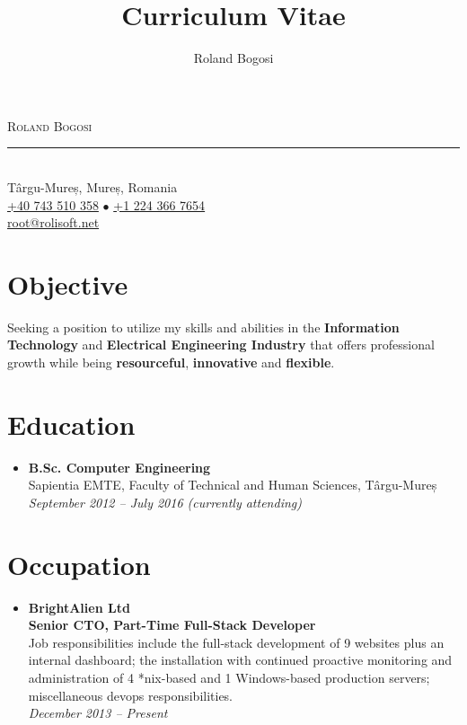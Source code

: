 \documentclass[12pt,a4paper]{article}
\author{Roland Bogosi}
\title{Curriculum Vitae}
\begin{document}
	\begin{center}
	\textsc{\Huge Roland Bogosi}\\
	\vspace{-2mm}
	\rule{300pt\color{LightGray}}{0.5px}\\
	\vspace{0.5mm}
	{\lsstyle\color{DarkGray} Târgu-Mureș, Mureș, Romania\\
	\href{tel:+40743510358}{\color{DarkGray} +40 743 510 358} {\color{LightGray}$\bullet$} \href{tel:+12243667654}{\color{DarkGray} +1 224 366 7654}\\
	\href{mailto:root@rolisoft.net}{\color{DarkGray} root@rolisoft.net}}
	\end{center}

\section*{Objective}
	Seeking a position to utilize my skills and abilities in the \textbf{Information Technology} and \textbf{Electrical Engineering Industry} that offers professional growth while being \textbf{resourceful}, \textbf{innovative} and \textbf{flexible}.

\section*{Education}
	\begin{itemize}
	\item	{\large\textbf{B.Sc. Computer Engineering}}\\
			Sapientia EMTE, Faculty of Technical and Human Sciences, Târgu-Mureș\\
			\textit{September 2012 – July 2016 (currently attending)}
	\end{itemize}

\section*{Occupation}
	\begin{itemize}
	\item	{\large\textbf{BrightAlien Ltd}}\\
			\textbf{Senior CTO, Part-Time Full-Stack Developer}\\
			Job responsibilities include the full-stack development of 9 websites plus an internal dashboard; the installation with continued proactive monitoring and administration of 4 *nix-based and 1 Windows-based production servers; miscellaneous devops responsibilities.\\
			\textit{December 2013 – Present}
	\end{itemize}
\end{document}
